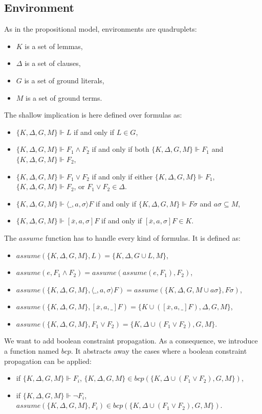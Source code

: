 \documentclass[a4paper,11pt]{article}
\newcommand{\A}{\mathit{assume}}
\newcommand{\B}{\mathit{bcp}}
\begin{document}
\subsection{Environment}
As in the propositional model, environments are quadruplets:
\begin{itemize}
 \item $K$ is a set of lemmas,
 \item $\Delta$ is a set of clauses,
 \item $G$ is a set of ground literals,
 \item $M$ is a set of ground terms.
\end{itemize}
The shallow implication is here defined over formulas as:
\begin{itemize}
 \item $\{K,\Delta,G,M\}\Vdash L$ if and only if $L\in G$,
 \item $\{K,\Delta,G,M\}\Vdash F_1\wedge F_2$ if and only if both $\{K,\Delta,G,M\}\Vdash F_1$
and $\{K,\Delta,G,M\}\Vdash F_2$,
 \item $\{K,\Delta,G,M\}\Vdash F_1\vee F_2$ if and only if either
$\{K,\Delta,G,M\}\Vdash F_1$, $\{K,\Delta,G,M\}\Vdash F_2$, or $F_1\vee F_2\in\Delta$.
 \item $\{K,\Delta,G,M\}\Vdash\langle\_,a,\sigma\rangle F$ if and only if $\{K,\Delta,G,M\}\Vdash F\sigma$
and $a\sigma\subseteq M$,
 \item $\{K,\Delta,G,M\}\Vdash[\overline x,a,\sigma]F$ if and only if $[\overline x,a,\sigma]F\in K$.
\end{itemize}
The $\A$ function has to handle every kind of formulas. It is defined as:
\begin{itemize}
 \item $\A(\{K,\Delta,G,M\},L)=\{K,\Delta,G\cup L,M\}$,
 \item $\A(e,F_1\wedge F_2)=\A(\A(e,F_1),F_2)$,
 \item $\A(\{K,\Delta,G,M\},\langle\_,a,\sigma\rangle F)=
\A(\{K,\Delta,G,M\cup a\sigma\},F\sigma)$,
 \item $\A(\{K,\Delta,G,M\},[\overline x,a,\_]F)=\{K\cup([\overline x,a,\_]F),\Delta,G,M\}$,
 \item $\A(\{K,\Delta,G,M\},F_1\vee F_2)=\{K,\Delta\cup(F_1\vee F_2),G,M\}$.
\end{itemize}
We want to add boolean constraint propagation. As a consequence, we introduce a function named $\B$.
It abstracts away the cases where a boolean constraint propagation can be applied:
\begin{itemize}
 \item if $\{K,\Delta,G,M\}\Vdash F_i$, $\{K,\Delta,G,M\}\in\B(\{K,\Delta\cup(F_1\vee F_2),G,M\})$,
 \item if $\{K,\Delta,G,M\}\Vdash\neg F_i$, $\A(\{K,\Delta,G,M\},F_i)\in
\B(\{K,\Delta\cup(F_1\vee F_2),G,M\})$.
\end{itemize}
\end{document}
